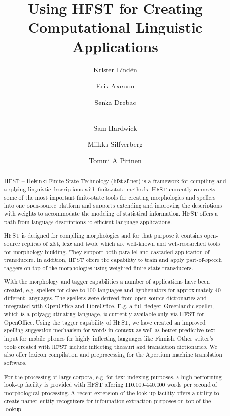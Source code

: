 \documentclass{llncs}
\begin{document}
%
\title{Using HFST for Creating Computational Linguistic Applications}
%
\author{Krister Lind\'{e}n \and Erik Axelson \and Senka Drobac \and\\
Sam Hardwick \and Miikka Silfverberg \and Tommi A Pirinen }


\maketitle

\begin{abstract}
\sloppy HFST – Helsinki Finite-State Technology (\url{hfst.sf.net})
is a framework for compiling and applying linguistic descriptions
with finite-state
methods. HFST currently connects some of the most important finite-state
tools for creating morphologies and spellers into one open-source
platform and supports extending and improving the descriptions with
weights to accommodate the modeling of statistical information. HFST
offers a path from language descriptions to efficient language
applications.

HFST is designed for compiling morphologies and for that purpose it
contains open-source replicas of xfst, lexc and twolc which are
well-known and well-researched tools for morphology building. They
support both parallel and cascaded application of transducers. In
addition, HFST offers the capability to train and apply part-of-speech
taggers on top of the morphologies using weighted finite-state transducers.

With the morphology and tagger capabilities a number of applications
have been created, e.g. spellers for close to 100 languages and
hyphenators for approximately 40 different languages. The spellers were
derived from open-source dictionaries and integrated with OpenOffice and
LibreOffice. E.g. a full-fledged Greenlandic speller, which is a
polyagglutinating language, is currently available only via HFST for
OpenOffice. Using the tagger capability of HFST, we have created an
improved spelling suggestion mechanism for words in context as well as
better predictive text input for mobile phones for highly inflecting
languages like Finnish. Other writer’s tools created with HFST include
inflecting thesauri and translation dictionaries. We also offer lexicon
compilation and preprocessing for the Apertium machine translation
software.

For the processing of large corpora, e.g. for text indexing purposes, a
high-performing look-up facility is provided with HFST offering
110.000-440.000 words per second of morphological processing. A recent
extension of the look-up facility offers a utility to create named
entity recognizers for information extraction purposes on top of the
lookup. 
\end{abstract}
\end{document}

